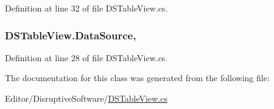 Definition at line 32 of file D\+S\+Table\+View.\+cs.

\hypertarget{class_d_s_table_view_a5d2e65a1502e3f4ab250a0a4deeebf89}{
\subsubsection[{Data\+Source}]{ D\+S\+Table\+View.\+Data\+Source\hspace{0.3cm}{\ttfamily [get]}, {\ttfamily [set]}}}\label{class_d_s_table_view_a5d2e65a1502e3f4ab250a0a4deeebf89}


Definition at line 28 of file D\+S\+Table\+View.\+cs.



The documentation for this class was generated from the following file\+:\begin{DoxyCompactItemize}
\item 
Editor/\+Disruptive\+Software/\hyperlink{_d_s_table_view_8cs}{D\+S\+Table\+View.\+cs}\end{DoxyCompactItemize}
